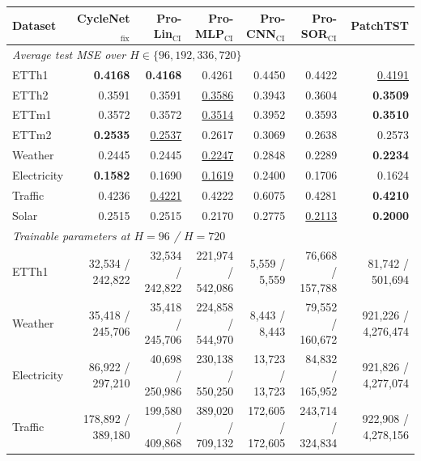 \begin{tabular}{lrrrrrr}
\toprule
\textbf{Dataset} & \textbf{CycleNet$_{\text{fix}}$} & \textbf{Pro-Lin$_{\text{CI}}$} & \textbf{Pro-MLP$_{\text{CI}}$} & \textbf{Pro-CNN$_{\text{CI}}$} & \textbf{Pro-SOR$_{\text{CI}}$} & \textbf{PatchTST} \\
\midrule
\multicolumn{7}{l}{\textit{Average test MSE over $H\in\{96,192,336,720\}$}} \\
ETTh1 & \textbf{0.4168} & \textbf{0.4168} & 0.4261 & 0.4450 & 0.4422 & \underline{0.4191} \\
ETTh2 & 0.3591 & 0.3591 & \underline{0.3586} & 0.3943 & 0.3604 & \textbf{0.3509} \\
ETTm1 & 0.3572 & 0.3572 & \underline{0.3514} & 0.3952 & 0.3593 & \textbf{0.3510} \\
ETTm2 & \textbf{0.2535} & \underline{0.2537} & 0.2617 & 0.3069 & 0.2638 & 0.2573 \\
Weather & 0.2445 & 0.2445 & \underline{0.2247} & 0.2848 & 0.2289 & \textbf{0.2234} \\
Electricity & \textbf{0.1582} & 0.1690 & \underline{0.1619} & 0.2400 & 0.1706 & 0.1624 \\
Traffic & 0.4236 & \underline{0.4221} & 0.4222 & 0.6075 & 0.4281 & \textbf{0.4210} \\
Solar & 0.2515 & 0.2515 & 0.2170 & 0.2775 & \underline{0.2113} & \textbf{0.2000} \\
\midrule
\multicolumn{7}{l}{\textit{Trainable parameters at $H=96$ / $H=720$}} \\
ETTh1 & 32{,}534 / 242{,}822 & 32{,}534 / 242{,}822 & 221{,}974 / 542{,}086 & 5{,}559 / 5{,}559 & 76{,}668 / 157{,}788 & 81{,}742 / 501{,}694 \\
Weather & 35{,}418 / 245{,}706 & 35{,}418 / 245{,}706 & 224{,}858 / 544{,}970 & 8{,}443 / 8{,}443 & 79{,}552 / 160{,}672 & 921{,}226 / 4{,}276{,}474 \\
Electricity & 86{,}922 / 297{,}210 & 40{,}698 / 250{,}986 & 230{,}138 / 550{,}250 & 13{,}723 / 13{,}723 & 84{,}832 / 165{,}952 & 921{,}826 / 4{,}277{,}074 \\
Traffic & 178{,}892 / 389{,}180 & 199{,}580 / 409{,}868 & 389{,}020 / 709{,}132 & 172{,}605 / 172{,}605 & 243{,}714 / 324{,}834 & 922{,}908 / 4{,}278{,}156 \\
\bottomrule
\end{tabular}
